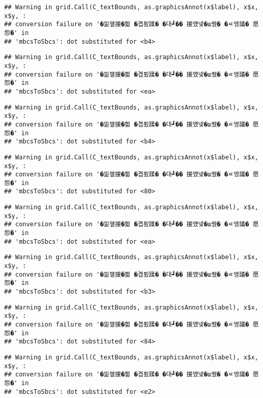 \documentclass[
]{article}
\begin{document}
\begin{verbatim}
## Warning in grid.Call(C_textBounds, as.graphicsAnnot(x$label), x$x, x$y, :
## conversion failure on '�낆쟾援�쁾 �곕룄蹂� �대┛�� 援먰넻�ш퀬� �ㅼ엥議� 愿怨�' in
## 'mbcsToSbcs': dot substituted for <b4>
\end{verbatim}

\begin{verbatim}
## Warning in grid.Call(C_textBounds, as.graphicsAnnot(x$label), x$x, x$y, :
## conversion failure on '�낆쟾援�쁾 �곕룄蹂� �대┛�� 援먰넻�ш퀬� �ㅼ엥議� 愿怨�' in
## 'mbcsToSbcs': dot substituted for <ea>
\end{verbatim}

\begin{verbatim}
## Warning in grid.Call(C_textBounds, as.graphicsAnnot(x$label), x$x, x$y, :
## conversion failure on '�낆쟾援�쁾 �곕룄蹂� �대┛�� 援먰넻�ш퀬� �ㅼ엥議� 愿怨�' in
## 'mbcsToSbcs': dot substituted for <b4>
\end{verbatim}

\begin{verbatim}
## Warning in grid.Call(C_textBounds, as.graphicsAnnot(x$label), x$x, x$y, :
## conversion failure on '�낆쟾援�쁾 �곕룄蹂� �대┛�� 援먰넻�ш퀬� �ㅼ엥議� 愿怨�' in
## 'mbcsToSbcs': dot substituted for <80>
\end{verbatim}

\begin{verbatim}
## Warning in grid.Call(C_textBounds, as.graphicsAnnot(x$label), x$x, x$y, :
## conversion failure on '�낆쟾援�쁾 �곕룄蹂� �대┛�� 援먰넻�ш퀬� �ㅼ엥議� 愿怨�' in
## 'mbcsToSbcs': dot substituted for <ea>
\end{verbatim}

\begin{verbatim}
## Warning in grid.Call(C_textBounds, as.graphicsAnnot(x$label), x$x, x$y, :
## conversion failure on '�낆쟾援�쁾 �곕룄蹂� �대┛�� 援먰넻�ш퀬� �ㅼ엥議� 愿怨�' in
## 'mbcsToSbcs': dot substituted for <b3>
\end{verbatim}

\begin{verbatim}
## Warning in grid.Call(C_textBounds, as.graphicsAnnot(x$label), x$x, x$y, :
## conversion failure on '�낆쟾援�쁾 �곕룄蹂� �대┛�� 援먰넻�ш퀬� �ㅼ엥議� 愿怨�' in
## 'mbcsToSbcs': dot substituted for <84>
\end{verbatim}

\begin{verbatim}
## Warning in grid.Call(C_textBounds, as.graphicsAnnot(x$label), x$x, x$y, :
## conversion failure on '�낆쟾援�쁾 �곕룄蹂� �대┛�� 援먰넻�ш퀬� �ㅼ엥議� 愿怨�' in
## 'mbcsToSbcs': dot substituted for <e2>
\end{verbatim}
\end{document}
